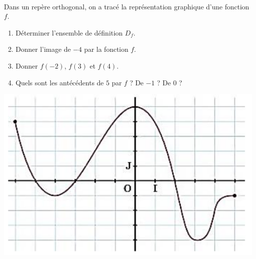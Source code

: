 \documentclass[11pt]{article}
\begin{document}
\begin{exo}~\\
\begin{minipage}{.6\textwidth}
Dans un repère orthogonal, on a tracé la représentation
graphique d'une fonction $f$.
  \begin{enumerate}
    \item Déterminer l'ensemble de définition $D_f$.
    \item Donner l'image de $-4$ par la fonction $f$.
    \item Donner $f(-2)$, $f(3)$ et $f(4)$.
    \item Quels sont les antécédents de $5$ par $f$ ? De $-1$ ? De $0$ ?
  \end{enumerate}
\end{minipage}
\begin{minipage}{.4\textwidth}
  \begin{center}
    \includegraphics[scale=.3]{graph.png}
  \end{center}
\end{minipage}
\end{exo}
\end{document}
